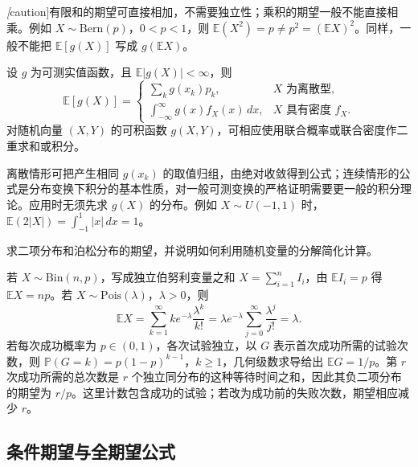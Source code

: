 \emph[caution]{有限和的期望可直接相加，不需要独立性；乘积的期望一般不能直接相乘。}例如 $X\sim\mathrm{Bern}(p)$，$0<p<1$，则 $\mathbb E(X^2)=p\ne p^2=(\mathbb E X)^2$。同样，一般不能把 $\mathbb E[g(X)]$ 写成 $g(\mathbb E X)$。

\begin{proposition}
\label{prop:study-function-expectation}
设 $g$ 为可测实值函数，且 $\mathbb E|g(X)|<\infty$，则
\begin{equation}
  \mathbb E[g(X)]=
  \begin{cases}
    \displaystyle\sum_k g(x_k)p_k,&X\text{ 为离散型},\\
    \displaystyle\int_{-\infty}^{\infty}g(x)f_X(x)\,dx,
      &X\text{ 具有密度 }f_X.
  \end{cases}
  \label{eq:study-function-expectation}
\end{equation}
对随机向量 $(X,Y)$ 的可积函数 $g(X,Y)$，可相应使用联合概率或联合密度作二重求和或积分。
\end{proposition}

离散情形可把产生相同 $g(x_k)$ 的取值归组，由绝对收敛得到公式；连续情形的公式是分布变换下积分的基本性质，对一般可测变换的严格证明需要更一般的积分理论。应用时无须先求 $g(X)$ 的分布。例如 $X\sim U(-1,1)$ 时，$\mathbb E(2|X|)=\int_{-1}^1|x|\,dx=1$。

\begin{example}
\label{ex:study-poisson-binomial-means}
求二项分布和泊松分布的期望，并说明如何利用随机变量的分解简化计算。
\end{example}

\begin{solve}
若 $X\sim\mathrm{Bin}(n,p)$，写成独立伯努利变量之和 $X=\sum_{i=1}^nI_i$，由 $\mathbb E I_i=p$ 得 $\mathbb E X=np$。若 $X\sim\mathrm{Pois}(\lambda)$，$\lambda>0$，则
\[
  \mathbb E X=\sum_{k=1}^{\infty}k e^{-\lambda}\frac{\lambda^k}{k!}
    =\lambda e^{-\lambda}\sum_{j=0}^{\infty}\frac{\lambda^j}{j!}
    =\lambda.
\]
若每次成功概率为 $p\in(0,1)$，各次试验独立，以 $G$ 表示首次成功所需的试验次数，则 $\mathbb P(G=k)=p(1-p)^{k-1}$，$k\ge1$，几何级数求导给出 $\mathbb E G=1/p$。第 $r$ 次成功所需的总次数是 $r$ 个独立同分布的这种等待时间之和，因此其负二项分布的期望为 $r/p$。这里计数包含成功的试验；若改为成功前的失败次数，期望相应减少 $r$。
\end{solve}

\subsection{条件期望与全期望公式}
\label{subsec:study-conditional-expectation}

